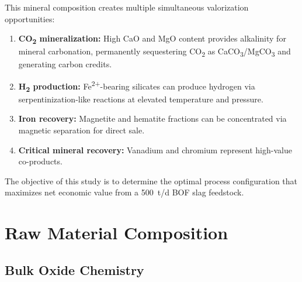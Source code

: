 \documentclass[11pt,a4paper]{article}
\begin{document}
This mineral composition creates multiple simultaneous valorization opportunities:
\begin{enumerate}[noitemsep]
  \item \textbf{CO\textsubscript{2} mineralization:} High CaO and MgO content provides alkalinity for mineral carbonation, permanently sequestering CO\textsubscript{2} as CaCO\textsubscript{3}/MgCO\textsubscript{3} and generating carbon credits.
  \item \textbf{H\textsubscript{2} production:} Fe\textsuperscript{2+}-bearing silicates can produce hydrogen via serpentinization-like reactions at elevated temperature and pressure.
  \item \textbf{Iron recovery:} Magnetite and hematite fractions can be concentrated via magnetic separation for direct sale.
  \item \textbf{Critical mineral recovery:} Vanadium and chromium represent high-value co-products.
\end{enumerate}

The objective of this study is to determine the optimal process configuration that maximizes net economic value from a \SI{500}{t/d} BOF slag feedstock.

\section{Raw Material Composition}

\subsection{Bulk Oxide Chemistry}
\end{document}
